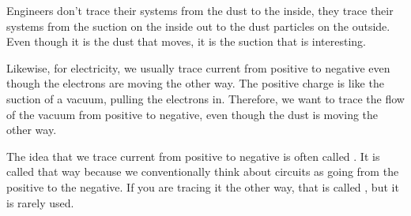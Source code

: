 Engineers don't trace their systems from the dust to the inside, they trace their systems from the suction on the inside out to the dust particles on the outside.
Even though it is the dust that moves, it is the suction that is interesting.

Likewise, for electricity, we usually trace current from positive to negative even though the electrons are moving the other way.
The positive charge is like the suction of a vacuum, pulling the electrons in.
Therefore, we want to trace the flow of the vacuum from positive to negative, even though the dust is moving the other way.

The idea that we trace current from positive to negative is often called .
It is called that way because we conventionally think about circuits as going from the positive to the negative.
If you are tracing it the other way, that is called , but it is rarely used.
